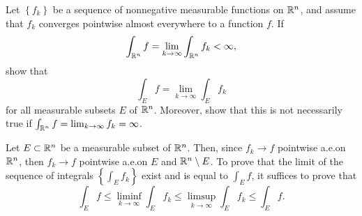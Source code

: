 \begin{problem}
Let $\left\{f_k\right\}$ be a sequence of nonnegative measurable functions
on $\mathbb{R}^n$, and assume that $f_k$ converges pointwise almost everywhere to
a function $f$. If
\[
\int_{\mathbb{R}^n} f=\lim_{k\to\infty}\int_{\mathbb{R}^n} f_k<\infty,
\]
show that
\[
\int_E f=\lim_{k\to\infty}\int_E f_k
\]
for all measurable subsets $E$ of $\mathbb{R}^n$. Moreover, show that this is not
necessarily true if $\int_{\mathbb{R}^n} f=\lim_{k\to\infty} f_k=\infty$.
\end{problem}
\begin{solution}
Let $E\subset\mathbb{R}^n$ be a measurable subset of $\mathbb{R}^n$. Then, since
$f_k\to f$ pointwise a.e.\@ on $\mathbb{R}^n$, then $f_k\to f$ pointwise a.e.\@ on
$E$ and $\mathbb{R}^n\setminus E$. To prove that the limit of the sequence
of integrals $\left\{\int_Ef_k\right\}$ exist and is equal to $\int_E f$,
it suffices to prove that
\begin{equation}
  \label{eq:prep:2:6}
\int_E
f\leq\liminf_{k\to\infty}\int_Ef_k\leq\limsup_{k\to\infty}\int_Ef_k\leq\int_E f.
\end{equation}


\end{solution}
